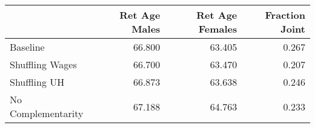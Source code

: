 \begin{tabular}{lrrr}
\toprule
{} & Ret Age Males & Ret Age Females & Fraction Joint \\
\midrule
Baseline           &        66.800 &          63.405 &          0.267 \\
Shuffling Wages    &        66.700 &          63.470 &          0.207 \\
Shuffling UH       &        66.873 &          63.638 &          0.246 \\
No Complementarity &        67.188 &          64.763 &          0.233 \\
\bottomrule
\end{tabular}
